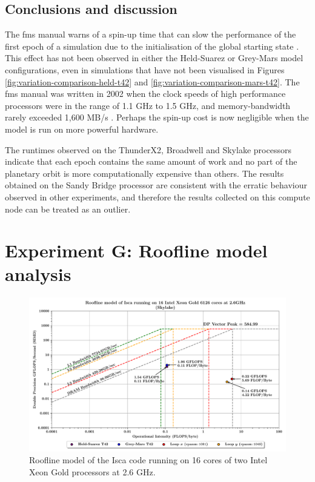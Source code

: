 \documentclass[a4paper,11pt]{report}
\begin{document}
\subsection{Conclusions and discussion}
The \gls{fms} manual warns of a spin-up time that can slow the performance of the first epoch of a simulation due to the initialisation of the global starting state \cite{balaji2002fms}. This effect has not been observed in either the Held-Suarez or Grey-Mars model configurations, even in simulations that have not been visualised in Figures \ref{fig:variation-comparison-held-t42} and \ref{fig:variation-comparison-mars-t42}. The \gls{fms} manual was written in 2002 when the clock speeds of high performance processors were in the range of 1.1 GHz to 1.5 GHz, and memory-bandwidth rarely exceeded 1,600 MB/s \cite{behling2001power4, carvalho2002gap}. Perhaps the spin-up cost is now negligible when the model is run on more powerful hardware. 

\par
The runtimes observed on the ThunderX2, Broadwell and Skylake processors indicate that each epoch contains the same amount of work and no part of the planetary orbit is more computationally expensive than others. The results obtained on the Sandy Bridge processor are consistent with the erratic behaviour observed in other experiments, and therefore the results collected on this compute node can be treated as an outlier. 


\section{Experiment G: Roofline model analysis}

\begin{figure}[htbp]
\begin{center}
 \includegraphics[width=\textwidth]{img/roofline_model_bluepebble.pdf}
\caption[Roofline model of Isca on Intel hardware]{Roofline model of the Isca code running on 16 cores of two Intel Xeon Gold processors at 2.6 GHz. } 
\label{fig:roofline}
\end{center}
\end{figure}
\end{document}
